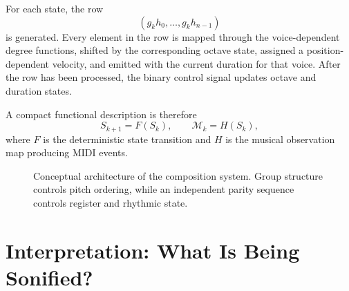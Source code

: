 \documentclass[11pt,a4paper]{article}
\begin{document}
For each state, the row
\[
( g_kh_0,\ldots,g_kh_{n-1})
\]
is generated. Every element in the row is mapped through the voice-dependent degree functions, shifted by the corresponding octave state, assigned a position-dependent velocity, and emitted with the current duration for that voice. After the row has been processed, the binary control signal updates octave and duration states.

A compact functional description is therefore
\[
S_{k+1}=F(S_k),
\qquad
\mathcal{M}_k=H(S_k),
\]
where $F$ is the deterministic state transition and $H$ is the musical observation map producing MIDI events.

\begin{figure}[ht]
\centering
{}
\caption{Conceptual architecture of the composition system. Group structure controls pitch ordering, while an independent parity sequence controls register and rhythmic state.}
\end{figure}

\section{Interpretation: What Is Being Sonified?}
\end{document}
